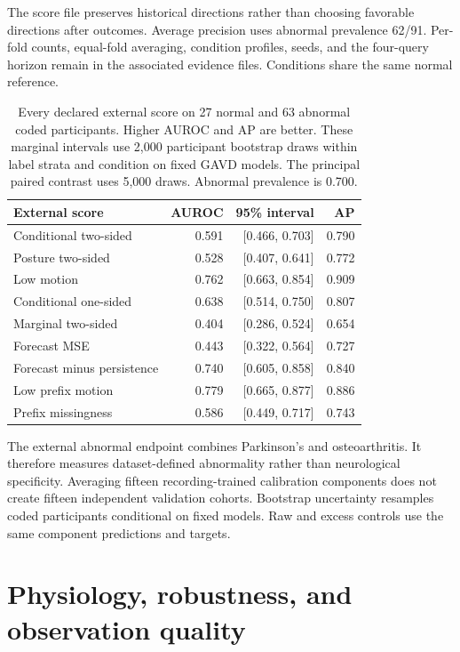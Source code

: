 \documentclass[letterpaper]{article}
\begin{document}
The score file preserves historical directions rather than choosing favorable directions after outcomes. Average precision uses abnormal prevalence 62/91. Per-fold counts, equal-fold averaging, condition profiles, seeds, and the four-query horizon remain in the associated evidence files. Conditions share the same normal reference.

\begin{table}[t]
\centering
\footnotesize
\begin{tabular}{lrrr}
\toprule
External score & AUROC & 95\% interval & AP \\
\midrule
Conditional two-sided & 0.591 & [0.466, 0.703] & 0.790 \\
Posture two-sided & 0.528 & [0.407, 0.641] & 0.772 \\
Low motion & 0.762 & [0.663, 0.854] & 0.909 \\
Conditional one-sided & 0.638 & [0.514, 0.750] & 0.807 \\
Marginal two-sided & 0.404 & [0.286, 0.524] & 0.654 \\
Forecast MSE & 0.443 & [0.322, 0.564] & 0.727 \\
Forecast minus persistence & 0.740 & [0.605, 0.858] & 0.840 \\
Low prefix motion & 0.779 & [0.665, 0.877] & 0.886 \\
Prefix missingness & 0.586 & [0.449, 0.717] & 0.743 \\
\bottomrule
\end{tabular}
\caption{Every declared external score on 27 normal and 63 abnormal coded participants. Higher AUROC and AP are better. These marginal intervals use 2,000 participant bootstrap draws within label strata and condition on fixed GAVD models. The principal paired contrast uses 5,000 draws. Abnormal prevalence is 0.700.}
\label{tab:external_rankings}
\end{table}

The external abnormal endpoint combines Parkinson's and osteoarthritis. It therefore measures dataset-defined abnormality rather than neurological specificity. Averaging fifteen recording-trained calibration components does not create fifteen independent validation cohorts. Bootstrap uncertainty resamples coded participants conditional on fixed models. Raw and excess controls use the same component predictions and targets.

\section{Physiology, robustness, and observation quality}
\end{document}
